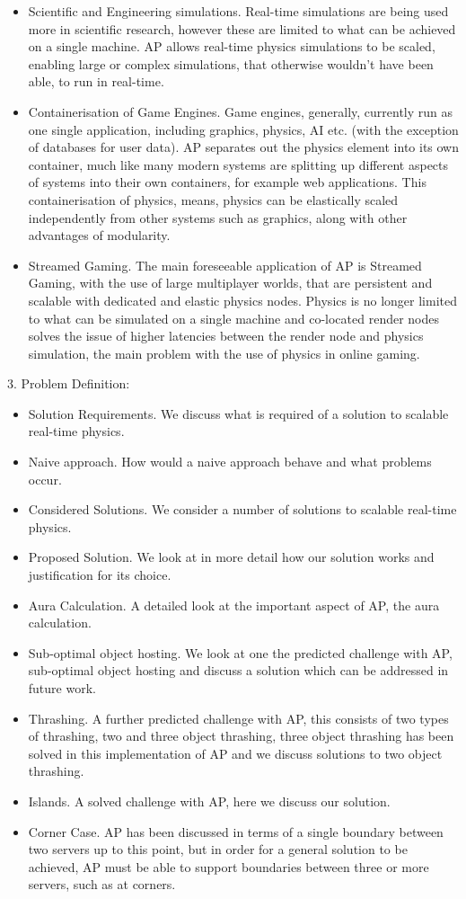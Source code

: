 \begin{itemize}
	\item Scientific and Engineering simulations. Real-time simulations are being used more in scientific research, however these are limited to what can be achieved on a single machine. AP allows real-time physics simulations to be scaled, enabling large or complex simulations, that otherwise wouldn't have been able, to run in real-time.
	\item Containerisation of Game Engines. Game engines, generally, currently run as one single application, including graphics, physics, AI etc. (with the exception of databases for user data). AP separates out the physics element into its own container, much like many modern systems are splitting up different aspects of systems into their own containers, for example web applications. This containerisation of physics, means, physics can be elastically scaled independently from other systems such as graphics, along with other advantages of modularity.
	\item Streamed Gaming. The main foreseeable application of AP is Streamed Gaming, with the use of large multiplayer worlds, that are persistent and scalable with dedicated and elastic physics nodes. Physics is no longer limited to what can be simulated on a single machine and co-located render nodes solves the issue of higher latencies between the render node and physics simulation, the main problem with the use of physics in online gaming.
\end{itemize}

3. Problem Definition:
\begin{itemize}
	\item Solution Requirements. We discuss what is required of a solution to scalable real-time physics.
	\item Naive approach. How would a naive approach behave and what problems occur.
	\item Considered Solutions. We consider a number of solutions to scalable real-time physics.
	\item Proposed Solution. We look at in more detail how our solution works and justification for its choice.
	\item Aura Calculation. A detailed look at the important aspect of AP, the aura calculation.
	\item Sub-optimal object hosting. We look at one the predicted challenge with AP, sub-optimal object hosting and discuss a solution which can be addressed in future work.
	\item Thrashing. A further predicted challenge with AP, this consists of two types of thrashing, two and three object thrashing, three object thrashing has been solved in this implementation of AP and we discuss solutions to two object thrashing.
	\item Islands. A solved challenge with AP, here we discuss our solution.
	\item Corner Case. AP has been discussed in terms of a single boundary between two servers up to this point, but in order for a general solution to be achieved, AP must be able to support boundaries between three or more servers, such as at corners.
\end{itemize}

